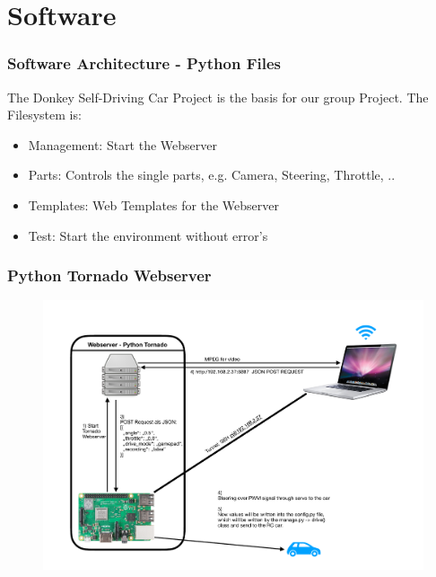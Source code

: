\documentclass{beamer}
\begin{document}
\section{Software}
%
\begin{frame}
\frametitle{Software Architecture - Python Files}
The Donkey Self-Driving Car Project is the basis for our group Project. The Filesystem is: \\
\begin{itemize}
\item Management: Start the Webserver
\item Parts: Controls the single parts, e.g. Camera, Steering, Throttle, ..
\item Templates: Web Templates for the Webserver
\item Test: Start the environment without error's
\end{itemize}
\end{frame}



\begin{frame}
\frametitle{Python Tornado Webserver}
\begin{figure}
\includegraphics[width=0.9\linewidth]{photo/webserver.pdf}
\end{figure}
\end{frame}

\end{document}
